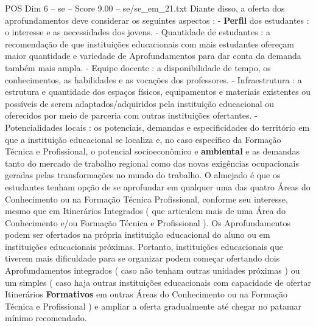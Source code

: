 \begin{textsample}{POS Dim 6 – se – Score 9.00 – se/se\_em\_21.txt}
Diante disso, a oferta dos aprofundamentos deve considerar os seguintes aspectos : - \textbf{Perfil} dos estudantes : o interesse e as necessidades dos jovens. - Quantidade de estudantes : a recomendação de que instituições educacionais com mais estudantes ofereçam maior quantidade e variedade de Aprofundamentos para dar conta da demanda também mais ampla. - Equipe docente : a disponibilidade de tempo, os conhecimentos, as habilidades e as vocações dos professores. - Infraestrutura : a estrutura e quantidade dos espaços físicos, equipamentos e materiais existentes ou possíveis de serem adaptados/adquiridos pela instituição educacional ou oferecidos por meio de parceria com outras instituições ofertantes. - Potencialidades locais : os potenciais, demandas e especificidades do território em que a instituição educacional se localiza e, no caso específico da Formação Técnica e Profissional, o potencial socioeconômico e \textbf{ambiental} e as demandas tanto do mercado de trabalho regional como das novas exigências ocupacionais geradas pelas transformações no mundo do trabalho.
O almejado é que os estudantes tenham opção de se aprofundar em qualquer uma das quatro Áreas do Conhecimento ou na Formação Técnica Profissional, conforme seu interesse, mesmo que em Itinerários Integrados ( que articulem mais de uma Área do Conhecimento e/ou Formação Técnica e Profissional ).
Os Aprofundamentos podem ser ofertados na própria instituição educacional do aluno ou em instituições educacionais próximas.
Portanto, instituições educacionais que tiverem mais dificuldade para se organizar podem começar ofertando dois Aprofundamentos integrados ( caso não tenham outras unidades próximas ) ou um simples ( caso haja outras instituições educacionais com capacidade de ofertar Itinerários \textbf{Formativos} em outras Áreas do Conhecimento ou na Formação Técnica e Profissional ) e ampliar a oferta gradualmente até chegar no patamar mínimo recomendado.

\end{textsample}
